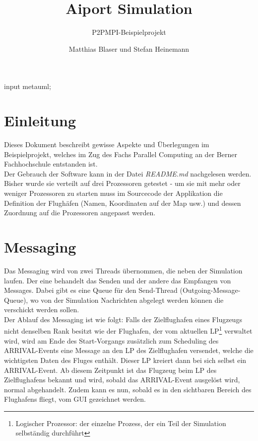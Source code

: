 \documentclass[oneside,DIV12,BCOR0.5cm,bibliography=totoc]{template}
\begin{document}
\begin{empfile}
\begin{empcmds}
input metauml;
\end{empcmds}


\title{Aiport Simulation}
\subtitle{P2PMPI-Beispielprojekt}

\author{Matthias Blaser und Stefan Heinemann }

\maketitle


\section{Einleitung}

Dieses Dokument beschreibt gewisse Aspekte und Überlegungen im Beispielprojekt, 
welches im Zug des Fachs Parallel Computing an der Berner Fachhochschule 
entstanden ist.\\

Der Gebrauch der Software kann in der Datei \emph{README.md} nachgelesen
werden. Bisher wurde sie verteilt auf drei Prozessoren getestet - um
sie mit mehr oder weniger Prozessoren zu starten muss im Sourcecode der
Applikation die Definition der Flughäfen (Namen, Koordinaten auf der
Map usw.) und dessen Zuordnung auf die Prozessoren angepasst werden.


\section{Messaging}

Das Messaging wird von zwei Threads übernommen, die neben der Simulation
laufen. Der eine behandelt das Senden und der andere das Empfangen
von Messages. Dabei gibt es eine Queue für den Send-Thread 
(Outgoing-Message-Queue), wo von der Simulation Nachrichten abgelegt
werden können die verschickt werden sollen.\\

Der Ablauf des Messaging ist wie folgt: Falls der Zielflughafen eines
Flugzeugs nicht denselben Rank besitzt wie der Flughafen, der vom
aktuellen LP\footnote{Logischer Prozessor: der einzelne Prozess, der ein
Teil der Simulation selbständig durchführt} verwaltet wird, wird am Ende
des Start-Vorgangs zusätzlich zum Scheduling des ARRIVAL-Events eine
Message an den LP des Zielflughafen versendet, welche die wichtigsten
Daten des Fluges enthält. Dieser LP kreiert dann bei sich selbst ein
ARRIVAL-Event. Ab diesem Zeitpunkt ist das Flugzeug beim LP des
Zielflughafens bekannt und wird, sobald das ARRIVAL-Event ausgelöst
wird, normal abgehandelt. Zudem kann es nun, sobald es in den sichtbaren
Bereich des Flughafens fliegt, vom GUI gezeichnet werden.\\


\end{empfile}
\end{document}
